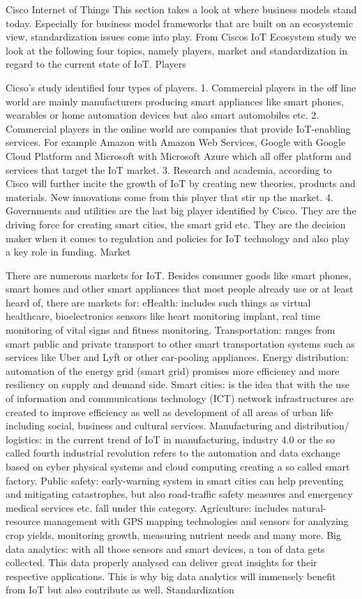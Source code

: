 Cisco Internet of Things
This section takes a look at where business models stand today. Especially for business model frameworks that are built on an ecosystemic view, standardization issues come into play. From Ciscos IoT Ecosystem study we look at the following four topics, namely players, market and standardization in regard to the current state of IoT.
Players

Cicso's study identified four types of players.
1. Commercial players in the off line world are mainly manufacturers producing smart appliances like smart phones, wearables or home automation devices but also smart automobiles etc.
2. Commercial players in the online world are companies that provide IoT-enabling services. For example Amazon with Amazon Web Services, Google with Google Cloud Platform and Microsoft with Microsoft Azure which all offer platform and services that target the IoT market.
3. Research and academia, according to Cisco will further incite the growth of IoT by creating new theories, products and materials. New innovations come from this player that stir up the market.
4. Governments and utilities are the last big player identified by Cisco. They are the driving force for creating smart cities, the smart grid etc. They are the decision maker when it comes to regulation and policies for IoT technology and also play a key role in funding.
Market

There are numerous markets for IoT. Besides consumer goods like smart phones, smart homes and other smart appliances that most people already use or at least heard of, there are markets for:
eHealth:  includes such things as virtual healthcare, bioelectronics sensors  like heart monitoring implant, real time monitoring of vital signs and fitness monitoring.
Transportation:  ranges from smart public and private transport to other smart transportation systems such as services like Uber and Lyft or other car-pooling appliances. 
Energy distribution: automation of the energy grid (smart grid) promises more efficiency and more resiliency on supply and demand side.
Smart cities: is the idea that with the use of information and communications technology (ICT) network infrastructures are created to improve efficiency as well as development of all areas of urban life including social, business and cultural services.
Manufacturing and distribution/ logistics: in the current trend of IoT in manufacturing, industry 4.0 or the so called fourth industrial revolution refers to the automation and data exchange based on cyber physical systems and cloud computing creating a so called smart factory. 
Public safety: early-warning system in smart cities can help preventing and mitigating catastrophes, but also road-traffic safety measures and emergency medical services etc. fall under this category.
Agriculture: includes natural-resource management with GPS mapping technologies and sensors for analyzing crop yields, monitoring growth, measuring nutrient needs and many more.
Big data analytics: with all those sensors and smart devices, a ton of data gets collected. This data properly analysed can deliver great insights for their respective applications. This is why big data analytics will immensely benefit from IoT but also contribute as well.
 Standardization


